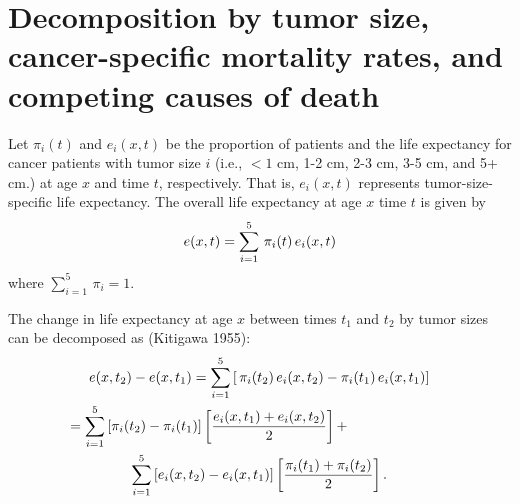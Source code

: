 \documentclass[12pt,letterpaper]{article}
\theoremstyle{plain}
\begin{document}
\newcommand{\hilight}[1]{\colorbox{yellow}{#1}}
\newcommand\ud{\mathrm{d}}
\newcommand\dist{\buildrel\rm d\over\sim}
\newcommand\ind{\stackrel{\rm indep.}{\sim}}
\newcommand\iid{\stackrel{\rm i.i.d.}{\sim}}
\newcommand\logit{{\rm logit}}
\renewcommand\r{\right}
\renewcommand\l{\left}
\newcommand\cA{\mathcal{A}}
\newcommand\alert{\textcolor{red}}
\newcommand\blue{\textcolor{blue}}
\newcommand\green{\textcolor{green}}
\newcommand\spacingset[1]{\renewcommand{\baselinestretch}%
{#1}\small\normalsize}
\spacingset{1}

\section{}
\label{sec:appendix} 
\label{subsec:appendix_decomp}

\section*{Decomposition by tumor size, cancer-specific mortality rates, and competing causes of death}

Let $\pi_i(t)$ and $e_i(x,t)$ be the proportion of patients and the
life expectancy for cancer patients with tumor size $i$ (i.e., $<1$
cm, 1-2 cm, 2-3 cm, 3-5 cm, and 5+ cm.) at age $x$ and time $t$,
respectively. That is, $e_i(x,t)$ represents tumor-size-specific life
expectancy. The overall life expectancy at age $x$ time $t$ is given
by
\begin{eqnarray}
  e(x,t)=\sum_{i=1}^{5}\,\pi_i(t)\,e_i(x,t) \notag
\end{eqnarray}
where $\sum_{i=1}^{5}\,\pi_i=1$. 

The change in life
expectancy at age $x$ between times $t_1$ and $t_2$ by tumor sizes can be decomposed as (Kitigawa 1955): 
\begin{multline}
  e(x,t_2)-e(x,t_1)=\sum_{i=1}^{5}\left[\,\pi_i(t_2)\,e_i(x,t_2)- \pi_i(t_1)\,e_i(x,t_1)\right]  \\
\hspace{-1in} =\sum_{i=1}^{5}\left[\pi_i(t_2)-\pi_i(t_1)
  \right]\left[\frac{e_i(x,t_1)+e_i(x,t_2)}{2}\right]+ \\
 \sum_{i=1}^{5}\left[e_i(x,t_2)-e_i(x,t_1) \right]\left[\frac{\pi_i(t_1)+\pi_i(t_2)}{2}\right].
 \label{eqn:decomp.basic}
\end{multline}
 
\end{document}
